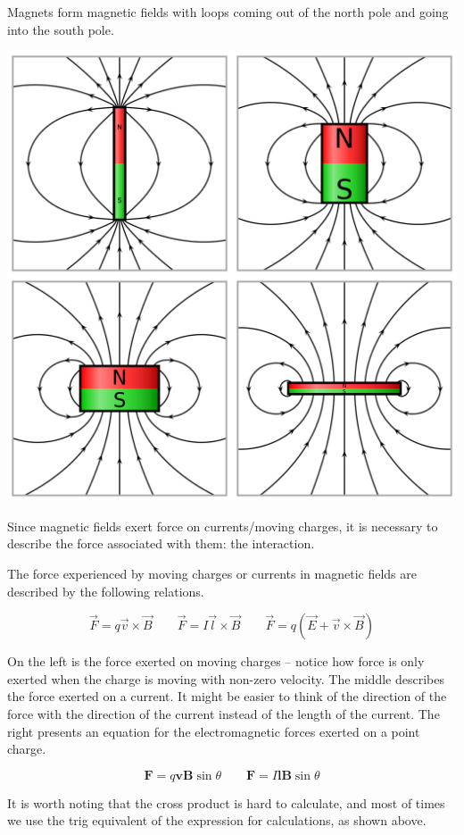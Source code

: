 Magnets form magnetic fields with loops coming out of the north pole and going into the south pole.

\hfil \includegraphics[scale=0.075]{assets/magnets.png}

Since magnetic fields exert force on currents/moving charges, it is necessary to describe the force associated with them: the interaction.

The force experienced by moving charges or currents in magnetic fields are described by the following relations.

\[\vec{F} = q\vec{v}\times\vec{B} \qquad \vec{F} = I\vec{l}\times\vec{B} \qquad \vec{F} = q(\vec{E} + \vec{v}\times\vec{B})\]

On the left is the force exerted on moving charges -- notice how force is only exerted when the charge is moving with non-zero velocity. The middle describes the force exerted on a current. It might be easier to think of the direction of the force with the direction of the current instead of the length of the current. The right presents an equation for the electromagnetic forces exerted on a point charge.

\[\mathbf{F} = q\mathbf{v}\mathbf{B}\sin\theta \qquad \mathbf{F} = I\mathbf{l}\mathbf{B}\sin\theta\]

It is worth noting that the cross product is hard to calculate, and most of times we use the trig equivalent of the expression for calculations, as shown above.

